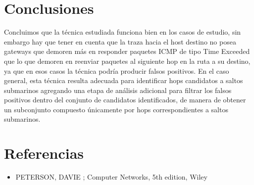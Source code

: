 \documentclass[10pt, a4paper]{article}
\begin{document}
\section{Conclusiones}

Concluimos que la técnica estudiada funciona bien en los casos de estudio, sin embargo hay que tener en cuenta que la traza hacia el host destino no posea gateways que demoren más en responder paquetes ICMP de tipo Time Exceeded que lo que demoren en reenviar paquetes al siguiente hop en la ruta a su destino, ya que en esos casos la técnica podría producir falsos positivos.
En el caso general, esta técnica resulta adecuada para identificar hops candidatos a saltos submarinos agregando una etapa de análisis adicional para filtrar los falsos positivos dentro del conjunto de candidatos identificados, de manera de obtener un subconjunto compuesto únicamente por hops correspondientes a saltos submarinos.

\section{Referencias}
\begin{itemize}
\item PETERSON, DAVIE ; Computer Networks, 5th edition, Wiley


\end{itemize}
\end{document}
